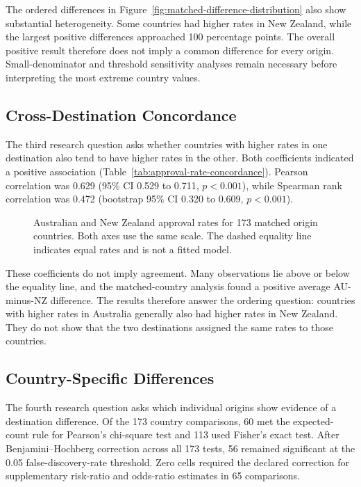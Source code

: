 \documentclass[runningheads]{llncs}
\begin{document}
The ordered differences in Figure~\ref{fig:matched-difference-distribution} also show substantial heterogeneity. Some countries had higher rates in New Zealand, while the largest positive differences approached 100 percentage points. The overall positive result therefore does not imply a common difference for every origin. Small-denominator and threshold sensitivity analyses remain necessary before interpreting the most extreme country values.

\subsection{Cross-Destination Concordance}

The third research question asks whether countries with higher rates in one destination also tend to have higher rates in the other. Both coefficients indicated a positive association (Table~\ref{tab:approval-rate-concordance}). Pearson correlation was 0.629 (95\% CI 0.529 to 0.711, $p<0.001$), while Spearman rank correlation was 0.472 (bootstrap 95\% CI 0.320 to 0.609, $p<0.001$).



\begin{figure}
\centering

\caption{Australian and New Zealand approval rates for 173 matched origin countries. Both axes use the same scale. The dashed equality line indicates equal rates and is not a fitted model.}
\label{fig:approval-rate-concordance}
\end{figure}

These coefficients do not imply agreement. Many observations lie above or below the equality line, and the matched-country analysis found a positive average AU-minus-NZ difference. The results therefore answer the ordering question: countries with higher rates in Australia generally also had higher rates in New Zealand. They do not show that the two destinations assigned the same rates to those countries.

\subsection{Country-Specific Differences}

The fourth research question asks which individual origins show evidence of a destination difference. Of the 173 country comparisons, 60 met the expected-count rule for Pearson's chi-square test and 113 used Fisher's exact test. After Benjamini--Hochberg correction across all 173 tests, 56 remained significant at the 0.05 false-discovery-rate threshold. Zero cells required the declared correction for supplementary risk-ratio and odds-ratio estimates in 65 comparisons.
\end{document}
